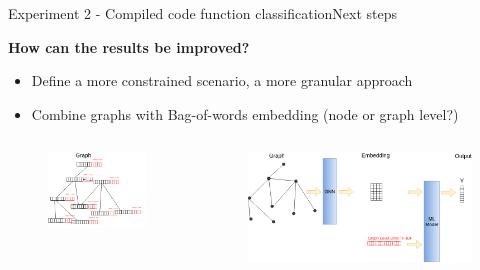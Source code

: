 \documentclass[xcolor=table]{beamer}
\begin{document}
\begin{frame}{Experiment 2 - Compiled code function classification}{Next steps}

\textbf{How can the results be improved?}
\begin{itemize}
    \item Define a more constrained scenario, a more granular approach
    \item Combine graphs with Bag-of-words embedding (node or graph level?)
\end{itemize}



\begin{columns}
    \begin{figure}[H]
      \centering
        \includegraphics[width=\linewidth]{img/Exp2_improvements_01.png}
    \end{figure}

        \begin{figure}[H]
      \centering
        \includegraphics[width=\linewidth]{img/Exp2_improvements_03.png}
    \end{figure}
\end{columns}

\end{frame}
\end{document}
